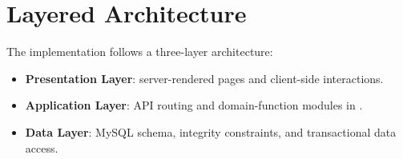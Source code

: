 \section{Layered Architecture}

The implementation follows a three-layer architecture:
\begin{itemize}
    \item \textbf{Presentation Layer}: server-rendered pages and client-side interactions.
    \item \textbf{Application Layer}: API routing and domain-function modules in .
    \item \textbf{Data Layer}: MySQL schema, integrity constraints, and transactional data access.
\end{itemize}



